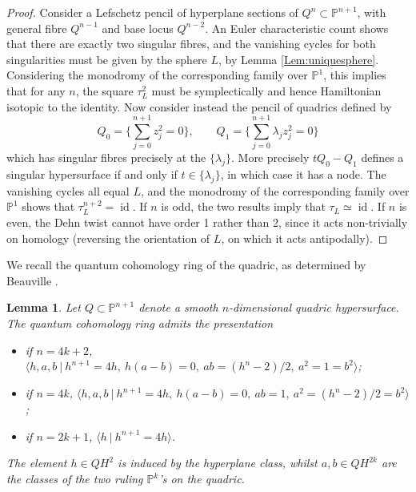 \documentclass[reqno,10pt]{amsart}
\numberwithin{equation}{section}
\newcommand{\bP}{{\mathbb P}}
\newcommand{\id}{\operatorname{id}}
\newtheorem{Lemma}[thm]{Lemma}
\theoremstyle{remark}
\begin{document}
 \begin{proof}
Consider a Lefschetz pencil of hyperplane sections of $Q^{n} \subset \bP^{n+1}$, with general fibre $Q^{n-1}$ and base locus $Q^{n-2}$.  An Euler characteristic count shows that there are exactly two singular fibres, and the vanishing cycles for both singularities must be given by the sphere $L$, by Lemma \ref{Lem:uniquesphere}.  Considering the monodromy of the corresponding family over $\bP^1$, this implies that for any $n$, the square $\tau_L^2$ must be symplectically and hence Hamiltonian isotopic to the identity.  Now consider instead the pencil of quadrics defined by
\begin{equation} \label{Eqn:Pencil}
Q_0 = \{ \sum_{j=0}^{n+1} z_j^2 = 0\}, \qquad Q_1 = \{\sum_{j=0}^{n+1} \lambda_j z_j^2 = 0\}
\end{equation}
which has singular fibres precisely at the $\{\lambda_j\}$. More precisely $tQ_0-Q_1$ defines a  singular hypersurface if and only if $t\in\{\lambda_j\}$, in which case it has a node.  The vanishing cycles all equal $L$, and the monodromy of the corresponding family over $\bP^1$ shows that  $\tau_L^{n+2} = \id$. If $n$ is odd, the two results imply that $\tau_L \simeq \id$. If $n$ is even, the Dehn twist cannot have order 1 rather than 2, since it acts non-trivially on homology (reversing the orientation of $L$, on which it acts antipodally).
 \end{proof}

We recall the quantum cohomology ring of the quadric, as determined by Beauville \cite{Beauville}.

\begin{Lemma} \label{Lem:QuadricQH}
Let $Q \subset \bP^{n+1}$ denote a smooth $n$-dimensional quadric hypersurface.  The quantum cohomology ring admits the presentation
\begin{itemize}
\item if $n=4k+2$, $\langle h, a, b \ | \ h^{n+1} = 4h, \ h(a-b) = 0, \ ab = (h^n-2)/2, \ a^2=1=b^2 \rangle$;

\item if $n=4k$, $\langle h, a, b \ | \ h^{n+1} = 4h, \ h(a-b) = 0, \ ab = 1, \ a^2=(h^n-2)/2=b^2 \rangle$;

\item if $n=2k+1$, $\langle h \ | \ h^{n+1} = 4h \rangle$.

\end{itemize}
The element $h\in QH^2$ is induced by the hyperplane class, whilst $a,b \in QH^{2k}$ are the classes of the two ruling $\bP^k$'s on the quadric.
\end{Lemma}
\end{document}
